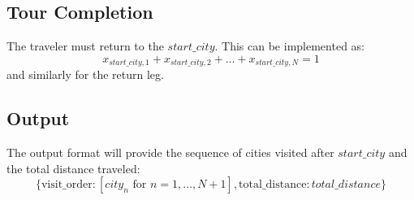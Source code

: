 \documentclass{article}
\begin{document}
\subsection*{Tour Completion}
The traveler must return to the $start\_city$. This can be implemented as:
\[
x_{start\_city,1} + x_{start\_city,2} + \ldots + x_{start\_city,N} = 1
\]
and similarly for the return leg.

\subsection*{Output}
The output format will provide the sequence of cities visited after $start\_city$ and the total distance traveled:
\[
\{
\text{visit\_order}: [city_n \text{ for } n = 1, \ldots, N+1],
\text{total\_distance}: total\_distance
\}
\]
\end{document}
